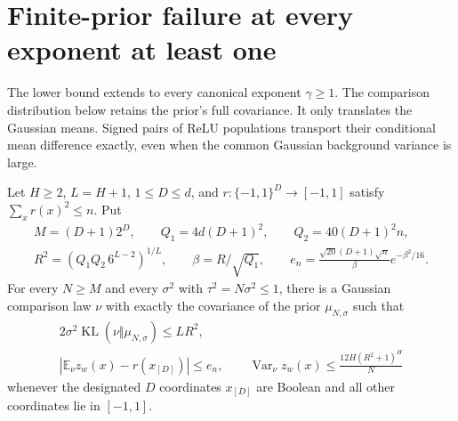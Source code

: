 \section{Finite-prior failure at every exponent at least one}
\label{sec:relu-native-covariance}

The lower bound extends to every canonical exponent $\gamma\geq1$.
The comparison distribution below retains the prior's full covariance.
It only translates the Gaussian means.  Signed pairs of ReLU
populations transport their conditional mean difference exactly, even
when the common Gaussian background variance is large.

\begin{lemma}
\label{lem:relu-native-memorizer}
Let $H\geq2$, $L=H+1$, $1\leq D\leq d$, and
$r:\{-1,1\}^D\to[-1,1]$ satisfy $\sum_xr(x)^2\leq n$.
Put
\begin{gather*}
 M=(D+1)2^D,\qquad Q_1=4d(D+1)^2,\qquad
 Q_2=40(D+1)^2n,\\
 R^2=(Q_1Q_2\,6^{L-2})^{1/L},\qquad
 \beta=R/\sqrt{Q_1},\qquad
 e_n=\frac{\sqrt{20}(D+1)\sqrt n}{\beta}
                                      e^{-\beta^2/16}.
\end{gather*}
For every $N\geq M$ and every $\sigma^2$ with
$\tau^2=N\sigma^2\leq1$, there is a Gaussian comparison law $\nu$
with exactly the covariance of the prior $\mu_{N,\sigma}$ such that
\begin{gather}
 2\sigma^2\operatorname{KL}(\nu\Vert\mu_{N,\sigma})\leq LR^2,
 \label{eq:relu-native-entropy}\\
 |\mathbb E_\nu z_w(x)-r(x_{[D]})|\leq e_n,\qquad
 \operatorname{Var}_\nu z_w(x)
                 \leq\frac{12H(R^2+1)^H}{N}
 \label{eq:relu-native-accuracy}
\end{gather}
whenever the designated $D$ coordinates $x_{[D]}$ are Boolean and
all other coordinates lie in $[-1,1]$.
\end{lemma}

